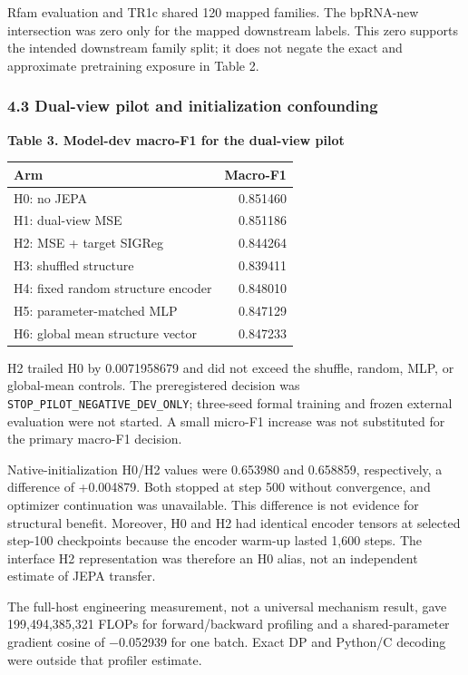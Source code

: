 \documentclass[
  11pt]{article}
\begin{document}
Rfam evaluation and TR1c shared 120 mapped families. The bpRNA-new
intersection was zero only for the mapped downstream labels. This zero
supports the intended downstream family split; it does not negate the
exact and approximate pretraining exposure in Table 2.

\hypertarget{43-dual-view-pilot-and-initialization-confounding}{%
\subsubsection{4.3 Dual-view pilot and initialization
confounding}\label{43-dual-view-pilot-and-initialization-confounding}}

\textbf{Table 3. Model-dev macro-F1 for the dual-view pilot}

\begin{longtable}[]{@{}lr@{}}
\toprule
Arm & Macro-F1 \\
\midrule
\endhead
H0: no JEPA & 0.851460 \\
H1: dual-view MSE & 0.851186 \\
H2: MSE + target SIGReg & 0.844264 \\
H3: shuffled structure & 0.839411 \\
H4: fixed random structure encoder & 0.848010 \\
H5: parameter-matched MLP & 0.847129 \\
H6: global mean structure vector & 0.847233 \\
\bottomrule
\end{longtable}

H2 trailed H0 by 0.0071958679 and did not exceed the shuffle, random,
MLP, or global-mean controls. The preregistered decision was
\texttt{STOP\_PILOT\_NEGATIVE\_DEV\_ONLY}; three-seed formal training
and frozen external evaluation were not started. A small micro-F1
increase was not substituted for the primary macro-F1 decision.

Native-initialization H0/H2 values were 0.653980 and 0.658859,
respectively, a difference of +0.004879. Both stopped at step 500
without convergence, and optimizer continuation was unavailable. This
difference is not evidence for structural benefit. Moreover, H0 and H2
had identical encoder tensors at selected step-100 checkpoints because
the encoder warm-up lasted 1,600 steps. The interface H2 representation
was therefore an H0 alias, not an independent estimate of JEPA transfer.

The full-host engineering measurement, not a universal mechanism result,
gave 199,494,385,321 FLOPs for forward/backward profiling and a
shared-parameter gradient cosine of −0.052939 for one batch. Exact DP
and Python/C decoding were outside that profiler estimate.
\end{document}
